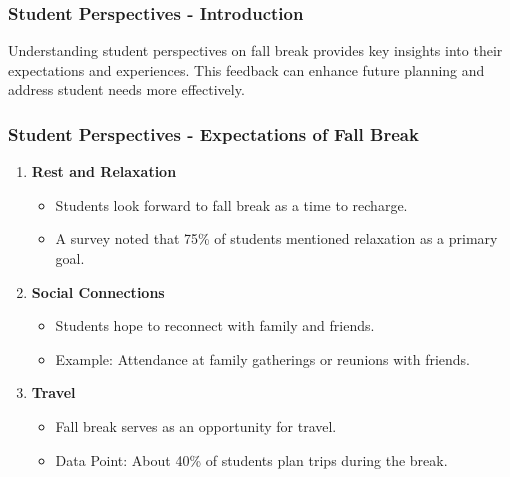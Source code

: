 \documentclass[aspectratio=169]{beamer}
\begin{document}
\begin{frame}[fragile]
    \frametitle{Student Perspectives - Introduction}
    Understanding student perspectives on fall break provides key insights into their expectations and experiences. This feedback can enhance future planning and address student needs more effectively.
\end{frame}

\begin{frame}[fragile]
    \frametitle{Student Perspectives - Expectations of Fall Break}
    \begin{enumerate}
        \item \textbf{Rest and Relaxation}
            \begin{itemize}
                \item Students look forward to fall break as a time to recharge.
                \item A survey noted that 75\% of students mentioned relaxation as a primary goal.
            \end{itemize}
        
        \item \textbf{Social Connections}
            \begin{itemize}
                \item Students hope to reconnect with family and friends.
                \item Example: Attendance at family gatherings or reunions with friends.
            \end{itemize}
        
        \item \textbf{Travel}
            \begin{itemize}
                \item Fall break serves as an opportunity for travel.
                \item Data Point: About 40\% of students plan trips during the break.
            \end{itemize}
    \end{enumerate}
\end{frame}
\end{document}
